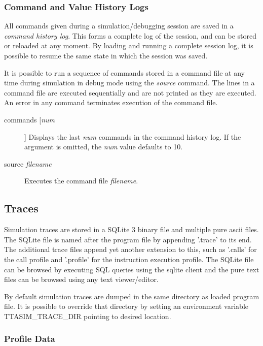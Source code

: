 \documentclass[twoside]{tceusermanual}
\begin{document}
\subsubsection{Command and Value History Logs}
\label{ssec:debug-history}

All commands given during a simulation/debugging session are saved in a
\emph{command history log}.  This forms a complete log of the session, and
can be stored or reloaded at any moment.  By loading and running a complete
session log, it is possible to resume the same state in which the session
was saved.

It is possible to run a sequence of commands stored in a command file at any
time during simulation in debug mode using the \emph{source} command.  The
lines in a command file are executed sequentially and are not printed as
they are executed.  An error in any command terminates execution of the
command file.

\begin{description}
\item[commands [\emph{num}]]%
  Displays the last \emph{num} commands in the command history log. If
  the argument is omitted, the \emph{num} value defaults to 10.

\item[source \emph{filename}]%
  Executes the command file \emph{filename}.

\end{description}

\subsection{Traces}
\label{sec:traces}

Simulation traces are stored in a SQLite 3 binary file and multiple pure
ascii files. The SQLite file is named after the program file by appending '.trace' 
to its end. The additional trace files append yet another extension to this,
such as '.calls' for the call profile and '.profile' for the instruction
execution profile. The SQLite file can be browsed by executing SQL queries
using the sqlite client and the pure text files can be browsed using any 
text viewer/editor.

By default simulation traces are dumped in the same directory as loaded program
file. It is possible to override that directory by setting an environment
variable TTASIM\_TRACE\_DIR pointing to desired location.

\subsubsection{Profile Data}
\end{document}
